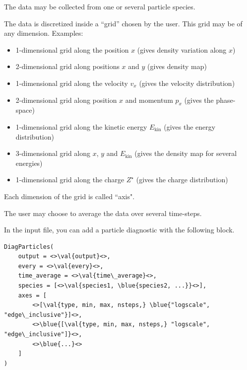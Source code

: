 \documentclass[11pt]{article}
\newcommand{\val}[1]{{\ttfamily \textit{#1}}}
\newcommand{\blue}[1]{{\color{blue} #1}}
\begin{document}
The data may be collected from one or several particle species.

The data is discretized inside a ``grid'' chosen by the user. This grid may be of any dimension.
Examples:
\begin{itemize}
\item 1-dimensional grid along the position $x$ (gives density variation along $x$)
\item 2-dimensional grid along positions $x$ and $y$ (gives density map)
\item 1-dimensional grid along the velocity $v_x$ (gives the velocity distribution)
\item 2-dimensional grid along position $x$ and momentum $p_x$ (gives the phase-space)
\item 1-dimensional grid along the kinetic energy $E_\mathrm{kin}$ (gives the energy distribution)
\item 3-dimensional grid along $x$, $y$ and $E_\mathrm{kin}$ (gives the density map for several energies)
\item 1-dimensional grid along the charge $Z^\star$ (gives the charge distribution)
\end{itemize}
Each dimension of the grid is called ``axis".

The user may choose to average the data over several time-steps.

In the input file, you can add a particle diagnostic with the following block.
\begin{lstlisting}
DiagParticles(
	output = <>\val{output}<>,
	every = <>\val{every}<>,
	time_average = <>\val{time\_average}<>,
	species = [<>\val{species1, \blue{species2, ...}}<>],
	axes = [
		<>[\val{type, min, max, nsteps,} \blue{"logscale", "edge\_inclusive"}]<>,
		<>\blue{[\val{type, min, max, nsteps,} "logscale", "edge\_inclusive"]}<>,
		<>\blue{...}<>
	]
)
\end{lstlisting}\vspace{-10pt}
\end{document}
